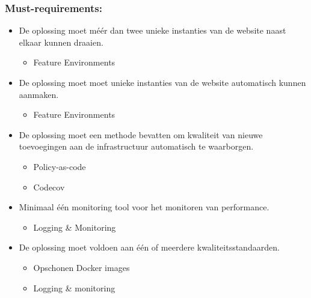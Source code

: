 
\subsubsection{Must-requirements:}
\begin{itemize}
	\item De oplossing moet méér dan twee unieke instanties van de website naast elkaar kunnen draaien.
	\begin{itemize}
		\item Feature Environments
	\end{itemize}
	
	\item De oplossing moet moet unieke instanties van de website automatisch kunnen aanmaken.
	\begin{itemize}
		\item Feature Environments
	\end{itemize}

	\item De oplossing moet een methode bevatten om kwaliteit van nieuwe toevoegingen aan de infrastructuur automatisch te waarborgen.
	\begin{itemize}
		\item Policy-as-code
		\item Codecov
	\end{itemize}

	\item Minimaal één monitoring tool voor het monitoren van performance.
	\begin{itemize}
		\item Logging \& Monitoring
	\end{itemize}

	\item De oplossing moet voldoen aan één of meerdere kwaliteitsstandaarden.
	\begin{itemize}
		\item Opschonen Docker images
		\item Logging \& monitoring
	\end{itemize}
\end{itemize}

